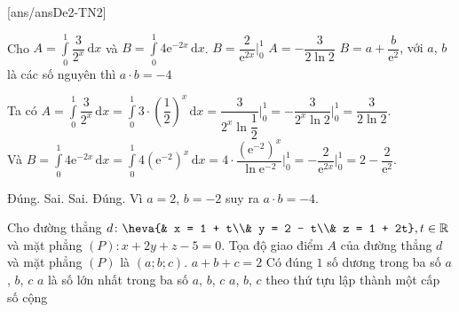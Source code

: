\TNTF
{}[ans/ansDe2-TN2]
\begin{ex}%
Cho $A=\displaystyle\int\limits_0^1 \dfrac{3}{2^x} \mathrm{\,d}x$ và  $B=\displaystyle\int\limits_0^1 4\mathrm{e}^{-2x} \mathrm{\,d}x$.
{$B=\dfrac{2}{\mathrm{e}^{2x}}\bigg|_0^1$}
{$A=-\dfrac{3}{2\ln 2}$}
{\True $B=a+\dfrac{b}{\mathrm{e}^2}$, với $a$, $b$ là các số nguyên thì $a\cdot b = -4$}
\loigiai
{Ta có $A=\displaystyle\int\limits_0^1 \dfrac{3}{2^x} \mathrm{\,d}x
= \displaystyle\int\limits_0^1 {3\cdot \left(\dfrac{1}{2}\right)^x} \mathrm{\,d}x
= \dfrac{3}{2^x\ln \dfrac{1}{2}}\bigg|_0^1
=-\dfrac{3}{2^x\ln 2}\bigg|_0^1
= \dfrac{3}{2\ln 2}$.\\
Và $B=\displaystyle\int\limits_0^1 4\mathrm{e}^{-2x} \mathrm{\,d}x
=\displaystyle\int\limits_0^1 4\left(\mathrm{e}^{-2}\right)^x \mathrm{\,d}x
= 4\cdot \dfrac{\left(\mathrm{e}^{-2}\right)^x}{\ln \mathrm{e}^{-2}}\bigg|_0^1
= -\dfrac{2}{\mathrm{e}^{2x}}\bigg|_0^1
=2 - \dfrac{2}{\mathrm{e}^2}$.
\begin{itemchoice}
\itemch Đúng.
\itemch Sai.
\itemch Sai.
\itemch Đúng. Vì $a=2$, $b=-2$ suy ra $a\cdot b = -4$.
\end{itemchoice}
}
\end{ex}

\begin{ex}%
Cho đường thẳng $d\colon \heva{& x = 1 + t\\& y = 2 - t\\& z = 1 + 2t}, t\in \mathbb{R}$ và mặt phẳng $(P)\colon x + 2y + z - 5 = 0$. Tọa độ giao điểm $A$ của đường thẳng $d$ và mặt phẳng $(P)$ là $(a;b;c)$.
\choiceTF
{\True $a+b+c = 2$}
{\True Có đúng $1$ số dương trong ba số $a$, $b$, $c$}
{$a$ là số lớn nhất trong ba số $a$, $b$, $c$}
{$a$, $b$, $c$ theo thứ tựu lập thành một cấp số cộng}
\end{ex}

